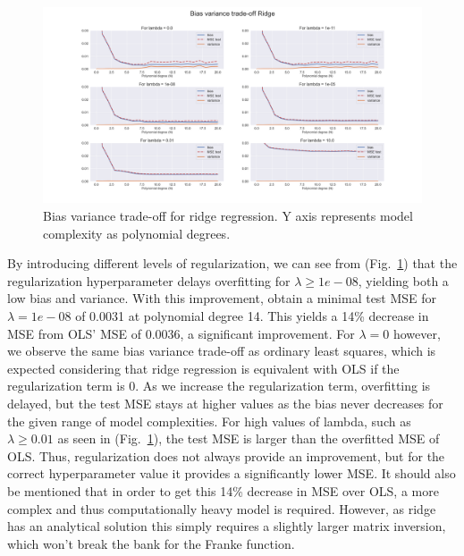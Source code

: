 \documentclass[onecolumn,10pt,cleanfoot]{asme2ej}
\begin{document}
\begin{figure}[H]
\centerline{\includegraphics[width=9in]{figs/BV_Ridge.png}}
\caption{Bias variance trade-off for ridge regression. Y axis represents model complexity as polynomial degrees.}
\label{Ridge}
\end{figure}

By introducing different levels of regularization, we can see from (Fig.~\ref{Ridge}) that the regularization hyperparameter delays overfitting for $\lambda \geq 1e-08$, yielding both a low bias and variance. With this improvement, obtain a minimal test MSE for $\lambda = 1e-08$ of 0.0031 at polynomial degree 14. This yields a 14\% decrease in MSE from OLS' MSE of 0.0036, a significant improvement. For $\lambda = 0$ however, we observe the same bias variance trade-off as ordinary least squares, which is expected considering that ridge regression is equivalent with OLS if the regularization term is 0. As we increase the regularization term, overfitting is delayed, but the test MSE stays at higher values as the bias never decreases for the given range of model complexities. For high values of lambda, such as $\lambda \geq 0.01$ as seen in (Fig.~\ref{Ridge}), the test MSE is larger than the overfitted MSE of  OLS. Thus, regularization does not always provide an improvement, but for the correct hyperparameter value it provides a significantly lower MSE. It should also be mentioned that in order to get this 14\% decrease in MSE over OLS, a more complex and thus computationally heavy model is required. However, as ridge has an analytical solution this simply requires a slightly larger matrix inversion, which won't break the bank for the Franke function.
\end{document}
